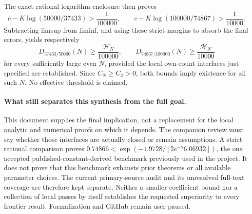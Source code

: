 The exact rational logarithm enclosure then proves
\[
 c-K\log(50000/37433)>\frac1{100000},\qquad
 c-K\log(100000/74867)>\frac1{10000}.
\]
Subtracting limsup from liminf, and using these strict margins to
absorb the final errors, yields respectively
\[
 D_{37433/50000}(N)\ge\frac{\mathcal H_N}{100000},\qquad
 D_{74867/100000}(N)\ge\frac{\mathcal H_N}{10000}
\]
for every sufficiently large even $N$, provided the local own-count
interfaces just specified are established.  Since $C_N\ge C_2>0$,
both bounds imply existence for all such $N$.  No effective threshold
is claimed.

\paragraph{What still separates this synthesis from the full goal.}
This document supplies the final implication, not a replacement
for the local analytic and numerical proofs on which it depends.
The companion review must say whether those interfaces are actually
closed or remain assumptions.  A strict rational comparison proves
$0.74866<\exp(-1.9728/[2e^{-\gamma}6.06932])$, the one accepted
published-constant-derived benchmark previously used in the project.
It does not prove that this benchmark exhausts prior theorems or
all available parameter choices.  The current primary-source audit
and its unresolved full-text coverage are therefore kept separate.
Neither a smaller coefficient bound nor a collection of local
passes by itself establishes the requested superiority to every
frontier result.  Formalization and GitHub remain user-paused.
